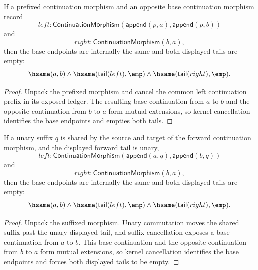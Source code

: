 \begin{theorem}
\label{thm:continuation-morphism-prefix-cycle-tails-empty}
If a prefixed continuation morphism and an opposite base continuation morphism
record
$$
left:\mathsf{ContinuationMorphism}(\mathsf{append}(p,a),\mathsf{append}(p,b))
$$
and
$$
right:\mathsf{ContinuationMorphism}(b,a),
$$
then the base endpoints are internally the same and both displayed tails are
empty:
$$
\hsame(a,b)\land
\hsame(\mathsf{tail}(left),\emp)\land
\hsame(\mathsf{tail}(right),\emp).
$$
\end{theorem}
\begin{proof}
Unpack the prefixed morphism and cancel the common left continuation prefix in
its exposed ledger. The resulting base continuation from $a$ to $b$ and the
opposite continuation from $b$ to $a$ form mutual extensions, so kernel
cancellation identifies the base endpoints and empties both tails.
\end{proof}

\begin{theorem}
\label{thm:continuation-morphism-unary-suffix-cycle-tails-empty}
If a unary suffix $q$ is shared by the source and target of the forward
continuation morphism, and the displayed forward tail is unary,
$$
left:\mathsf{ContinuationMorphism}(\mathsf{append}(a,q),\mathsf{append}(b,q))
$$
and
$$
right:\mathsf{ContinuationMorphism}(b,a),
$$
then the base endpoints are internally the same and both displayed tails are
empty:
$$
\hsame(a,b)\land
\hsame(\mathsf{tail}(left),\emp)\land
\hsame(\mathsf{tail}(right),\emp).
$$
\end{theorem}
\begin{proof}
Unpack the suffixed morphism. Unary commutation moves the shared suffix past
the unary displayed tail, and suffix cancellation exposes a base continuation
from $a$ to $b$. This base continuation and the opposite continuation from
$b$ to $a$ form mutual extensions, so kernel cancellation identifies the base
endpoints and forces both displayed tails to be empty.
\end{proof}

